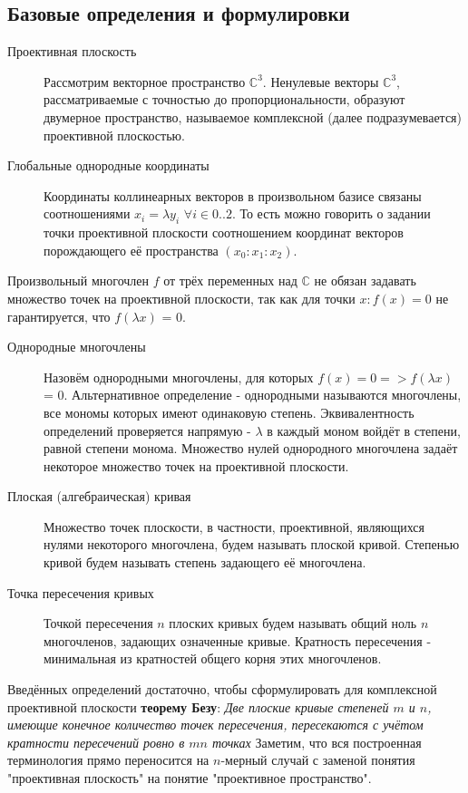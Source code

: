 \documentclass[a4paper, 12pt]{article}
\begin{document}
\subsection{Базовые определения и формулировки}
\begin{description}
\item[Проективная плоскость]
Рассмотрим векторное пространство $\mathbb{C}^3$. Ненулевые векторы $\mathbb{C}^3$, рассматриваемые с точностью до пропорциональности, образуют двумерное пространство, называемое комплексной (далее подразумевается) проективной плоскостью.
\item[Глобальные однородные координаты]
Координаты коллинеарных векторов в произвольном базисе связаны соотношениями $x_i = \lambda y_i$ $\forall i \in {0..2}$. То есть можно говорить о задании точки проективной плоскости соотношением координат векторов порождающего её пространства $(x_0:x_1:x_2)$.\newline
\end{description}
\bigskip
Произвольный многочлен $f$ от трёх переменных над $\mathbb{C}$ не обязан задавать множество точек на проективной плоскости, так как для точки $x: f(x) = 0$ не гарантируется, что $f(\lambda x)$ = 0.
\begin{description}
\item[Однородные многочлены] Назовём однородными многочлены, для которых $f(x) = 0 => f(\lambda x)$ = 0. Альтернативное определение - однородными называются многочлены, все мономы которых имеют одинаковую степень. Эквивалентность определений проверяется напрямую - $\lambda$ в каждый моном войдёт в степени, равной степени монома. Множество нулей однородного многочлена задаёт некоторое множество точек на проективной плоскости.
\item[Плоская (алгебраическая) кривая]
Множество точек плоскости, в частности, проективной, являющихся нулями некоторого многочлена, будем называть плоской кривой. Степенью кривой будем называть степень задающего её многочлена.
\item[Точка пересечения кривых]
Точкой пересечения $n$ плоских кривых будем называть общий ноль $n$ многочленов, задающих означенные кривые. Кратность пересечения - минимальная из кратностей общего корня этих многочленов.
\end{description}
Введённых определений достаточно, чтобы сформулировать для комплексной проективной плоскости \textbf{теорему Безу}:
\textit{Две плоские кривые степеней $m$ и $n$, имеющие конечное количество точек пересечения, пересекаются с учётом кратности пересечений ровно в $mn$ точках}\newline
Заметим, что вся построенная терминология прямо переносится на $n$-мерный случай с заменой понятия "проективная плоскость" на понятие "проективное пространство".
\end{document}
